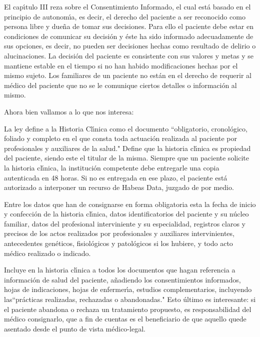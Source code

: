 El cap\'{\i}tulo III reza sobre el Consentimiento Informado, el cual est\'a basado en 
el principio de autonom\'{\i}a, es decir, el derecho del paciente a ser reconocido 
como persona libre y due\~na de tomar sus decisiones. Para ello el paciente debe estar en 
condiciones de comunicar su decisi\'on y  \'este ha sido informado adecuadamente de 
sus opciones, es decir, no pueden ser decisiones hechas como resultado de delirio 
o alucinaciones. La decisi\'on del paciente es consistente con sus valores y metas 
y se mantiene estable en el tiempo si no han habido modificaciones hechas por
el mismo sujeto. Los familiares de un paciente no est\'an en el derecho de 
requerir al m\'edico del paciente que no se le comunique ciertos detalles o
informaci\'on al mismo. 

Ahora bien vallamos a lo que nos interesa:

La ley define a la Historia Cl\'{\i}nica como el documento ``obligatorio, cronol\'ogico,
foliado y completo en el que consta toda actuaci\'on realizada al paciente por
profesionales y auxiliares de la salud." Define que la historia cl\'{\i}nica es 
propiedad del paciente, siendo este el titular de la misma. Siempre que un paciente 
solicite la historia cl\'{\i}nica, la instituci\'on competente debe entregarle una copia
autenticada en 48 horas. Si no es entregada en ese plazo, el
paciente est\'a autorizado a interponer un recurso de Habeas Data, juzgado de por 
medio. 

Entre los datos que han de consignarse en forma obligatoria esta la fecha de 
inicio y confecci\'on de la historia cl\'{\i}nica, datos identificatorios del paciente
y su n\'ucleo familiar, datos del profesional interviniente y su especialidad, 
registros claros y precisos de los actos realizados por profesionales y auxiliares
intervinientes, antecedentes gen\'eticos, fisiol\'ogicos y patol\'ogicos si los hubiere,
y todo acto m\'edico realizado o indicado.

Incluye en la historia cl\'{\i}nica a todos los documentos que hagan referencia a 
informaci\'on de salud del paciente, a\~nadiendo los consentimientos informados, 
hojas de indicaciones, hojas de enfermer\'{\i}a, estudios complementarios, 
incluyendo las``pr\'acticas realizadas, rechazadas o abandonadas." 
Esto  \'ultimo es interesante: si el paciente abandona o rechaza un tratamiento 
propuesto, es responsabilidad del m\'edico consignarlo, que a fin de cuentas es el
beneficiario de que aquello quede asentado desde el punto de vista m\'edico-legal.

